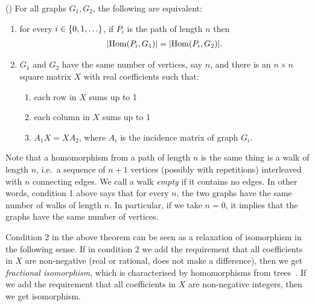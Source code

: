 \begin{theorem}\label{thm:grohe}(\cite[Theorem 2]{groheDellRattan2018})
    For all graphs $G_1,G_2$, the following  are equivalent:
    \begin{enumerate}
        \item for every $i \in \{0,1,\ldots\}$, if $P_i$ is the path of length $n$ then
        \begin{align*}
        |\mathrm {Hom}(P_i,G_1) | = |\mathrm {Hom}(P_i,G_2)|.
        \end{align*}
        \item $G_1$ and $G_2$  have the same number of vertices, say $n$, and there is an $n \times n$ square matrix $X$ with real coefficients such that:
        \begin{enumerate}
            \item each row in $X$ sums up to 1
            \item each column in $X$ sums up to 1
            \item $A_1 X = X A_2$, where $A_i$ is the incidence matrix of graph $G_i$.
        \end{enumerate}
    \end{enumerate}
\end{theorem}
Note that a homomorphism from a path of length $n$ is the same thing is a walk of length $n$, i.e.~a sequence of $n+1$ vertices (possibly with repetitions) interleaved with $n$ connecting edges. We call a walk \emph{empty} if it contains no edges. In other words, condition 1 above says that for every $n$, the two graphs have the same number of walks of length $n$. In particular, if we take $n=0$, it implies that the graphs have the same number of vertices.     

Condition 2 in the above theorem can be seen as a relaxation of isomorphism in the following sense. 
If in condition 2 we add the requirement that all coefficients in $X$ are non-negative (real or rational, does not make a difference), then we get  \emph{fractional isomorphism}, which is characterised by homomorphisms from trees~\cite[Theorem 1]{groheDellRattan2018}. If we add the requirement that all coefficients in $X$ are non-negative integers, then we get isomorphism.  

